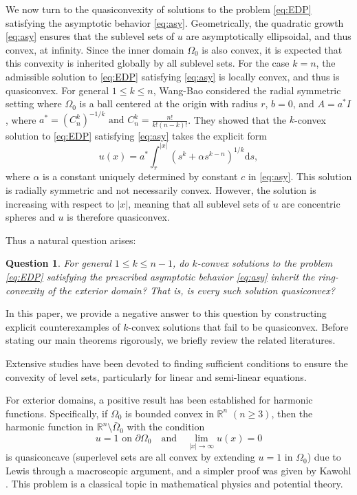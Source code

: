 \documentclass[reqno]{amsart}
\newtheorem{question}[theorem]{Question}
\theoremstyle{remark}
\theoremstyle{definition}
\numberwithin{equation}{section}
\begin{document}
We now turn to the quasiconvexity of solutions to the problem \eqref{eq:EDP} satisfying the asymptotic behavior \eqref{eq:asy}. Geometrically, the quadratic growth \eqref{eq:asy} ensures that the sublevel sets of $u$ are asymptotically ellipsoidal, and thus convex, at infinity. Since the inner domain $\Omega_0$ is also convex, it is expected that this convexity is inherited globally by all sublevel sets. For the case $k=n$, the admissible solution to \eqref{eq:EDP} satisfying \eqref{eq:asy} is locally convex, and thus is quasiconvex. For general $1\leq k\leq n$, Wang-Bao \cite{Wang-Bao} considered the radial symmetric setting where $\Omega_0$ is a ball centered at the origin with radius $r$, $b=0$, and $A=a^*I$, where $a^*=(C_n^k)^{-1/k}\text{ and } C_n^k=\frac{n!}{k!(n-k)!}$.
They showed that the $k$-convex solution to \eqref{eq:EDP} satisfying \eqref{eq:asy} takes the explicit form
$$u(x)=a^*\int_r^{|x|}(s^k+\alpha s^{k-n})^{1/k}\mathrm{d}s,$$
where
$\alpha$ is a constant uniquely determined by constant $c$ in \eqref{eq:asy}. This solution is radially symmetric and not necessarily convex. However, the solution is increasing with respect to $|x|$, meaning that all sublevel sets of $u$ are concentric spheres and $u$ is therefore quasiconvex. 

Thus a natural question arises: 

\begin{question}\label{Q}
	For general $1\leq k\leq n-1$, do $k$-convex solutions to the problem \eqref{eq:EDP} satisfying the prescribed asymptotic behavior \eqref{eq:asy} inherit the ring-convexity of the exterior domain? That is, is every such solution quasiconvex?
\end{question}

In this paper, we provide a negative answer to this question by constructing explicit counterexamples of $k$-convex solutions that fail to be quasiconvex. Before stating our main theorems rigorously, we briefly review the related literatures.

Extensive studies have been devoted to finding sufficient conditions to ensure the convexity of level sets, particularly for linear and semi-linear equations.  

For exterior domains, a positive result has been established for harmonic functions. Specifically, if $\Omega_0$ is bounded convex in $\mathbb{R}^n$ $(n\geq3)$, then the harmonic function in $\mathbb{R}^n\setminus\bar{\Omega}_0$ with the condition
\begin{equation*}
u=1 \text{ on }\partial\Omega_0\quad\text{and}\quad\lim_{|x|\to\infty} u(x)=0
\end{equation*}
is quasiconcave (superlevel sets are all convex by extending $u=1$ in $\Omega_0$) due to Lewis \cite{Lewis-1977} through a macroscopic argument, and a simpler proof was given by Kawohl \cite{Kawohl-1985}. This problem is a classical topic in mathematical physics and potential theory. 
\end{document}
